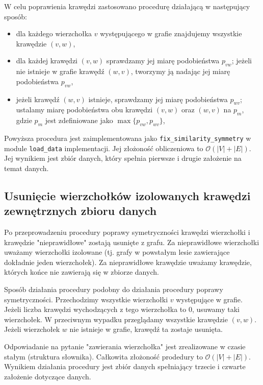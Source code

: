 \documentclass[a4paper,10pt]{article}
\begin{document}
W celu poprawienia krawędzi zastosowano procedurę działającą w następujący sposób:
\begin{itemize}
 \item dla każdego wierzchołka $v$ występującego w grafie znajdujemy wszystkie krawędzie $\left(v, w\right)$,
 \item dla każdej krawędzi $\left(v, w\right)$ sprawdzamy jej miarę podobieństwa $p_{vw}$; jeżeli nie istnieje w grafie krawędź $\left(w, v\right)$, tworzymy ją nadając jej miarę podobieństwa $p_{vw}$,
 \item jeżeli krawędź $\left(w, v\right)$ istnieje, sprawdzamy jej miarę podobieństwa $p_{wv}$; ustalamy miarę podobieństwa obu krawędzi $\left(v, w\right)$ oraz $\left(w, v\right)$ na $p_{m}$, gdzie $p_{m}$ jest zdefiniowane jako $\max\{p_{vw}, p_{wv}\}$,
\end{itemize}

Powyższa procedura jest zaimplementowana jako \texttt{fix\_similarity\_symmetry} w module \texttt{load\_data} implementacji. Jej złożoność obliczeniowa to $\mathcal{O}\left(\left|V\right| + \left|E\right|\right)$. Jej wynikiem jest zbiór danych, który spełnia pierwsze i drugie założenie na temat danych.

\subsection{Usunięcie wierzchołków izolowanych krawędzi zewnętrznych zbioru danych} 

Po przeprowadzeniu procedury poprawy symetryczności krawędzi wierzchołki i krawędzie "nieprawidłowe" zostają usunięte z grafu. Za nieprawidłowe wierzchołki uważamy wierzchołki izolowane (tj. grafy w powstałym lesie zawierające dokładnie jeden wierzchołek). Za nieprawidłowe krawędzie uważamy krawędzie, których końce nie zawierają się w zbiorze danych.

Sposób działania procedury podobny do działania procedury poprawy symetryczności. Przechodzimy wszystkie wierzchołki $v$ występujące w grafie. Jeżeli liczba krawędzi wychodzących z tego wierzchołka to $0$, usuwamy taki wierzchołek. W przeciwnym wypadku przeglądamy wszystkie krawędzie $\left(v, w\right)$. Jeżeli wierzchołek $w$ nie istnieje w grafie, krawędź ta zostaje usunięta.

Odpowiadanie na pytanie "zawierania wierzchołka" jest zrealizowane w czasie stałym (struktura słownika). Całkowita złożoność prodedury to $\mathcal{O}\left(\left|V\right| + \left|E\right|\right)$. Wynikiem działania procedury jest zbiór danych spełniający trzecie i czwarte założenie dotyczące danych.
\end{document}
